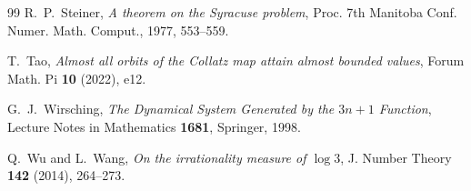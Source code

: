 \documentclass[11pt, a4paper]{amsart}
\theoremstyle{plain}
\theoremstyle{definition}
\theoremstyle{remark}
\begin{document}
\begin{thebibliography}{99}
R.~P.~Steiner,
\emph{A theorem on the Syracuse problem},
Proc. 7th Manitoba Conf. Numer. Math. Comput., 1977, 553--559.

T.~Tao,
\emph{Almost all orbits of the Collatz map attain almost bounded
values},
Forum Math. Pi \textbf{10} (2022), e12.

G.~J.~Wirsching,
\emph{The Dynamical System Generated by the $3n + 1$ Function},
Lecture Notes in Mathematics \textbf{1681}, Springer, 1998.

Q.~Wu and L.~Wang,
\emph{On the irrationality measure of $\log 3$},
J. Number Theory \textbf{142} (2014), 264--273.

\end{thebibliography}
\end{document}
